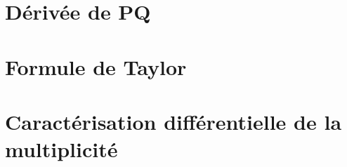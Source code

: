 \documentclass{article}
\begin{document}
\section{Dérivée de PQ}
\section{Formule de Taylor}
\section{Caractérisation différentielle de la multiplicité}
\end{document}
